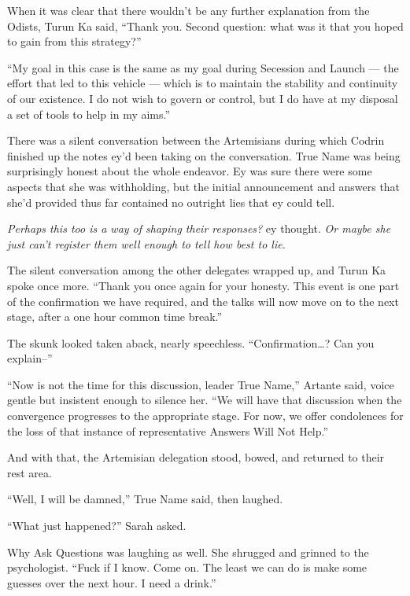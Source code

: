 When it was clear that there wouldn't be any further explanation from the Odists, Turun Ka said, ``Thank you. Second question: what was it that you hoped to gain from this strategy?''

``My goal in this case is the same as my goal during Secession and Launch — the effort that led to this vehicle — which is to maintain the stability and continuity of our existence. I do not wish to govern or control, but I do have at my disposal a set of tools to help in my aims.''

There was a silent conversation between the Artemisians during which Codrin finished up the notes ey'd been taking on the conversation. True Name was being surprisingly honest about the whole endeavor. Ey was sure there were some aspects that she was withholding, but the initial announcement and answers that she'd provided thus far contained no outright lies that ey could tell.

\emph{Perhaps this too is a way of shaping their responses?} ey thought. \emph{Or maybe she just can't register them well enough to tell how best to lie.}

The silent conversation among the other delegates wrapped up, and Turun Ka spoke once more. ``Thank you once again for your honesty. This event is one part of the confirmation we have required, and the talks will now move on to the next stage, after a one hour common time break.''

The skunk looked taken aback, nearly speechless. ``Confirmation\ldots? Can you explain--''

``Now is not the time for this discussion, leader True Name,'' Artante said, voice gentle but insistent enough to silence her. ``We will have that discussion when the convergence progresses to the appropriate stage. For now, we offer condolences for the loss of that instance of representative Answers Will Not Help.''

And with that, the Artemisian delegation stood, bowed, and returned to their rest area.

``Well, I will be damned,'' True Name said, then laughed.

``What just happened?'' Sarah asked.

Why Ask Questions was laughing as well. She shrugged and grinned to the psychologist. ``Fuck if I know. Come on. The least we can do is make some guesses over the next hour. I need a drink.''
